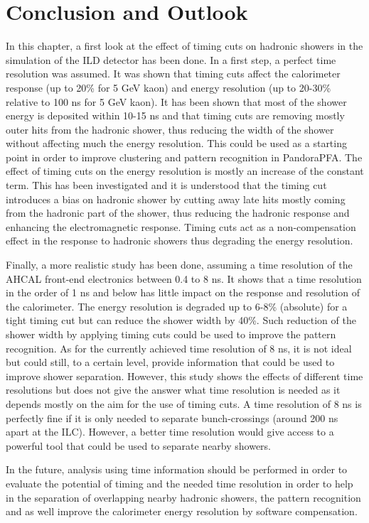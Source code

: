 \section{Conclusion and Outlook}

In this chapter, a first look at the effect of timing cuts on hadronic showers in the \geant simulation of the ILD detector has been done. In a first step, a perfect time resolution was assumed. It was shown that timing cuts affect the calorimeter response (up to 20\% for 5 GeV kaon) and energy resolution (up to 20-30\% relative to 100 ns for 5 GeV kaon). It has been shown that most of the shower energy is deposited within 10-15 ns and that timing cuts are removing mostly outer hits from the hadronic shower, thus reducing the width of the shower without affecting much the energy resolution. This could be used as a starting point in order to improve clustering and pattern recognition in PandoraPFA. The effect of timing cuts on the energy resolution is mostly an increase of the constant term. This has been investigated and it is understood that the timing cut introduces a bias on hadronic shower by cutting away late hits mostly coming from the hadronic part of the shower, thus reducing the hadronic response and enhancing the electromagnetic response. Timing cuts act as a non-compensation effect in the response to hadronic showers thus degrading the energy resolution.

Finally, a more realistic study has been done, assuming a time resolution of the AHCAL front-end electronics between 0.4 to 8 ns. It shows that a time resolution in the order of 1 ns and below has little impact on the response and resolution of the calorimeter. The energy resolution is degraded up to 6-8\% (absolute) for a tight timing cut but can reduce the shower width by 40\%. Such reduction of the shower width by applying timing cuts could be used to improve the pattern recognition. As for the currently achieved time resolution of 8 ns, it is not ideal but could still, to a certain level, provide information that could be used to improve shower separation. However, this study shows the effects of different time resolutions but does not give the answer what time resolution is needed as it depends mostly on the aim for the use of timing cuts. A time resolution of 8 ns is perfectly fine if it is only needed to separate bunch-crossings (around 200 ns apart at the ILC). However, a better time resolution would give access to a powerful tool that could be used to separate nearby showers.

In the future, analysis using time information should be performed in order to evaluate the potential of timing and the needed time resolution in order to help in the separation of overlapping nearby hadronic showers, the pattern recognition and as well improve the calorimeter energy resolution by software compensation.
